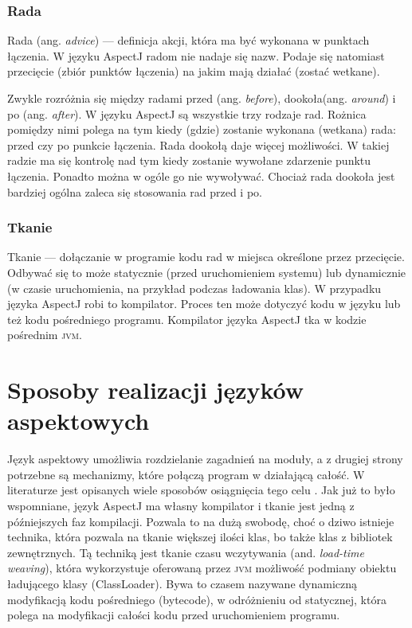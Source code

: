 \documentclass[a4paper,12pt]{mwbk}
\begin{document}
\subsection{Rada}\label{rada}
		
Rada (ang. \emph{advice}) --- definicja akcji, która ma być wykonana w punktach
łączenia.  W języku AspectJ radom nie nadaje się nazw.  Podaje się natomiast
przecięcie (zbiór punktów łączenia) na jakim mają działać (zostać wetkane).    

Zwykle rozróżnia się między radami przed (ang. \emph{before}), dookoła(ang.
\emph{around}) i po (ang. \emph{after}). W języku AspectJ są wszystkie trzy
rodzaje rad. Rożnica pomiędzy nimi polega na tym kiedy (gdzie) zostanie
wykonana (wetkana) rada: przed czy po punkcie łączenia. Rada dookołą daje
więcej możliwości. W takiej radzie ma się kontrolę nad tym kiedy zostanie
wywołane zdarzenie punktu łączenia. Ponadto można w ogóle go nie wywoływać.
Chociaż rada dookoła jest bardziej ogólna zaleca się stosowania rad przed i po.

\subsection{Tkanie}\label{tkanie}

Tkanie --- dołączanie w programie kodu rad w miejsca określone przez
przecięcie. Odbywać się to może statycznie (przed uruchomieniem systemu) lub
dynamicznie (w czasie uruchomienia, na przykład podczas ładowania klas). W
przypadku języka AspectJ robi to kompilator. Proces ten może dotyczyć kodu w
języku lub też kodu pośredniego programu.  Kompilator języka AspectJ tka w
kodzie pośrednim \textsc{jvm}.









\chapter{Sposoby realizacji języków aspektowych}

Język aspektowy umożliwia rozdzielanie zagadnień na moduły, a z drugiej strony
potrzebne są mechanizmy, które połączą program w działającą całość. W
literaturze jest opisanych wiele sposobów osiągnięcia tego celu
\cite{aosd,AspectJ,JVMSupport}. Jak już to było wspomniane, język AspectJ ma
własny kompilator i tkanie jest jedną z późniejszych faz kompilacji. Pozwala to
na dużą swobodę, choć o dziwo istnieje technika, która pozwala na tkanie
większej ilości klas, bo także klas z bibliotek zewnętrznych. Tą techniką jest
tkanie czasu wczytywania (and. \emph{load-time weaving}), która wykorzystuje
oferowaną przez \textsc{jvm} możliwość podmiany obiektu ładującego klasy
(ClassLoader). Bywa to czasem nazywane dynamiczną modyfikacją kodu pośredniego
(bytecode), w odróżnieniu od statycznej, która polega na modyfikacji całości
kodu przed uruchomieniem programu. 
\end{document}
